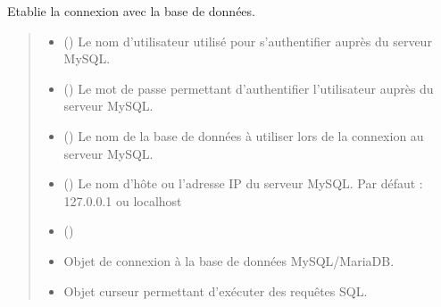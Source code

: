 \documentclass[letterpaper,10pt,french]{sphinxmanual}
\begin{document}
\begin{fulllineitems}
\label{\detokenize{library:lib_sql.connect_database}}
\pysigstartsignatures
\pysiglinewithargsret
{}
{}
{}
\pysigstopsignatures
\sphinxAtStartPar
Etablie la connexion avec la base de données.
\begin{quote}\begin{description}
\begin{itemize}
\item {} 
\sphinxAtStartPar
{} () \textendash{} Le nom d’utilisateur utilisé pour s’authentifier auprès du serveur MySQL.

\item {} 
\sphinxAtStartPar
{} () \textendash{} Le mot de passe permettant d’authentifier l’utilisateur auprès du serveur MySQL.

\item {} 
\sphinxAtStartPar
{} () \textendash{} Le nom de la base de données à utiliser lors de la connexion au serveur MySQL.

\item {} 
\sphinxAtStartPar
{} () \textendash{} Le nom d’hôte ou l’adresse IP du serveur MySQL. Par défaut : 127.0.0.1 ou localhost

\item {} 
\sphinxAtStartPar
{} ()

\end{itemize}

\sphinxAtStartPar
\begin{itemize}
\item {} 
\sphinxAtStartPar
{} \textendash{} Objet de connexion à la base de données MySQL/MariaDB.

\item {} 
\sphinxAtStartPar
{} \textendash{} Objet curseur permettant d’exécuter des requêtes SQL.

\end{itemize}


\end{description}\end{quote}

\end{fulllineitems}
\end{document}

